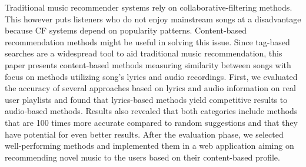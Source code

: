 \documentclass[12pt]{report}
\begin{document}
Traditional music recommender systems rely on collaborative-filtering methods. This however puts listeners who do not enjoy mainstream songs at a disadvantage because CF systems depend on popularity patterns. Content-based recommendation methods might be useful in solving this issue. Since tag-based searches are a widespread tool to aid traditional music recommendation, this paper presents content-based methods measuring similarity between songs with focus on methods utilizing song's lyrics and audio recordings.
First, we evaluated the accuracy of several approaches based on lyrics and audio information on real user playlists and found that lyrics-based methods yield competitive results to audio-based methods. Results also revealed that both categories include methods that are 100 times more accurate compared to random suggestions and that they have potential for even better results. After the evaluation phase, we selected well-performing methods and implemented them in a web application aiming on recommending novel music to the users based on their content-based profile.
\end{document}
